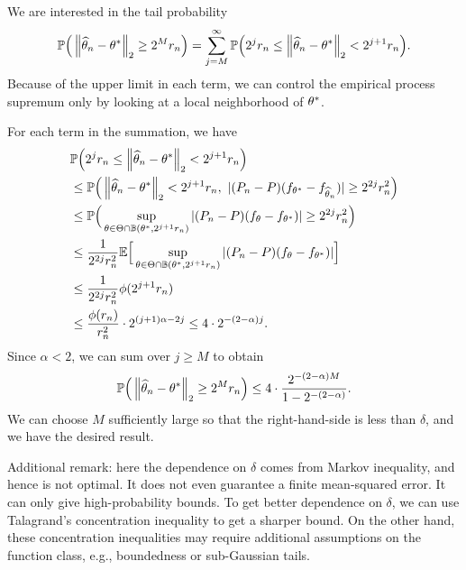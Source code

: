 \documentclass[11pt,letterpaper]{article}
\numberwithin{theorem}{lecture}
\numberwithin{proposition}{lecture}
\numberwithin{lemma}{lecture}
\numberwithin{claim}{lecture}
\numberwithin{corollary}{lecture}
\numberwithin{definition}{lecture}
\numberwithin{conjecture}{lecture}
\numberwithin{remark}{lecture}
\numberwithin{example}{lecture}
\numberwithin{equation}{lecture}
\begin{document}
We are interested in the tail probability
\begin{align*}
  {\mathbb{P}} \Big(\left\| \widehat{\theta}_n - {\theta^*}\right\|_{2} \geq 2^M r_n \Big) = \sum_{j = M}^{\infty} {\mathbb{P}} \Big( 2^j r_n \leq \left\| \widehat{\theta}_n - {\theta^*}\right\|_{2} < 2^{j + 1} r_n \Big).
\end{align*}
Because of the upper limit in each term, we can control the empirical process supremum only by looking at a local neighborhood of ${\theta^*}$.

For each term in the summation, we have
\begin{align*}
  &{\mathbb{P}} \Big( 2^j r_n \leq \left\| \widehat{\theta}_n - {\theta^*}\right\|_{2} < 2^{j + 1} r_n \Big)\\
  & \leq {\mathbb{P}} \Big( \left\| \widehat{\theta}_n - {\theta^*}\right\|_{2} < 2^{j + 1} r_n, ~  |(P_n - P) (f_{{\theta^*}} - f_{\widehat{\theta}_n})| \geq 2^{2j} r_n^2 \Big)\\
  &\leq {\mathbb{P}} \Big( \sup_{\theta \in \Theta \cap \mathbb{B} ({\theta^*}, 2^{j + 1} r_n)} |(P_n - P) (f_\theta - f_{{\theta^*}})| \geq 2^{2j} r_n^2 \Big)\\
  &\leq \frac{1}{2^{2j} r_n^2} {\mathbb{E}} \Big[ \sup_{\theta \in \Theta \cap \mathbb{B} ({\theta^*}, 2^{j + 1} r_n)} |(P_n - P) (f_\theta - f_{{\theta^*}})| \Big]\\
  &\leq \frac{1}{2^{2j} r_n^2} \phi (2^{j + 1} r_n)\\
  &\leq \frac{\phi (r_n)}{r_n^2} \cdot 2^{(j + 1) \alpha - 2 j} \leq 4 \cdot 2^{- (2 - \alpha) j}.
\end{align*}
Since $\alpha < 2$, we can sum over $j \geq M$ to obtain
\begin{align*}
  {\mathbb{P}} \Big(\left\| \widehat{\theta}_n - {\theta^*}\right\|_{2} \geq 2^M r_n \Big) \leq 4 \cdot \frac{2^{- (2 - \alpha) M}}{1 - 2^{-(2 - \alpha)}}.
\end{align*}
We can choose $M$ sufficiently large so that the right-hand-side is less than $\delta$, and we have the desired result.

Additional remark: here the dependence on $\delta$ comes from Markov inequality, and hence is not optimal. It does not even guarantee a finite mean-squared error. It can only give high-probability bounds. To get better dependence on $\delta$, we can use Talagrand's concentration inequality to get a sharper bound. On the other hand, these concentration inequalities may require additional assumptions on the function class, e.g., boundedness or sub-Gaussian tails.
\end{document}
